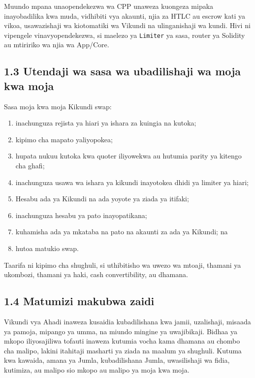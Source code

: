 \documentclass[11pt]{article}
\begin{document}
Muundo mpana unaopendekezwa wa CPP unaweza kuongeza mipaka inayobadilika kwa muda, vidhibiti vya akaunti, njia za HTLC au escrow kati ya vikoa, usawazishaji wa kiotomatiki wa Vikundi na ulinganishaji wa kundi. Hivi ni vipengele vinavyopendekezwa, si maelezo ya \texttt{Limiter} ya sasa, router ya Solidity au mtiririko wa njia wa App/Core.

\subsection*{1.3 Utendaji wa sasa wa ubadilishaji wa moja kwa moja}

Sasa moja kwa moja Kikundi swap:

\begin{enumerate}[leftmargin=*]
\item inachunguza rejista ya hiari ya ishara za kuingia na kutoka;
\item kipimo cha mapato yaliyopokea;
\item hupata nukuu kutoka kwa quoter iliyowekwa au hutumia parity ya kitengo cha ghafi;
\item inachunguza usawa wa ishara ya kikundi inayotokea dhidi ya limiter ya hiari;
\item Hesabu ada ya Kikundi na ada yoyote ya ziada ya itifaki;
\item inachunguza hesabu ya pato inayopatikana;
\item kuhamisha ada ya mkataba na pato na akaunti za ada ya Kikundi; na
\item hutoa matukio swap.
\end{enumerate}
Taarifa ni kipimo cha shughuli, si uthibitisho wa uwezo wa mtoaji, thamani ya ukombozi, thamani ya haki, cash convertibility, au dhamana.

\subsection*{1.4 Matumizi makubwa zaidi}

Vikundi vya Ahadi inaweza kusaidia kubadilishana kwa jamii, uzalishaji, misaada ya pamoja, mipango ya umma, na miundo mingine ya uwajibikaji. Bidhaa ya mkopo iliyosajiliwa tofauti inaweza kutumia vocha kama dhamana au chombo cha malipo, lakini itahitaji masharti ya ziada na maalum ya shughuli. Kutuma kwa kawaida, amana ya Jumla, kubadilishana Jumla, uwasilishaji wa fidia, kutimiza, au malipo sio mkopo au malipo ya moja kwa moja.
\end{document}
